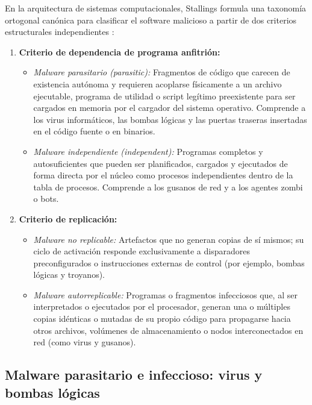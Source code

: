 \documentclass[12pt]{article}
\begin{document}
En la arquitectura de sistemas computacionales, Stallings formula una taxonomía ortogonal canónica para clasificar el software malicioso a partir de dos criterios estructurales independientes \parencite[\S 15.1, p.\ 659]{stallings2018operating}:
\begin{enumerate}[noitemsep, topsep=2pt]
    \item \textbf{Criterio de dependencia de programa anfitrión:}
    \begin{itemize}[noitemsep, topsep=1pt]
        \item \textit{Malware parasitario (\textit{parasitic}):} Fragmentos de código que carecen de existencia autónoma y requieren acoplarse físicamente a un archivo ejecutable, programa de utilidad o script legítimo preexistente para ser cargados en memoria por el cargador del sistema operativo. Comprende a los virus informáticos, las bombas lógicas y las puertas traseras insertadas en el código fuente o en binarios.
        \item \textit{Malware independiente (\textit{independent}):} Programas completos y autosuficientes que pueden ser planificados, cargados y ejecutados de forma directa por el núcleo como procesos independientes dentro de la tabla de procesos. Comprende a los gusanos de red y a los agentes zombi o bots.
    \end{itemize}
    \item \textbf{Criterio de replicación:}
    \begin{itemize}[noitemsep, topsep=1pt]
        \item \textit{Malware no replicable:} Artefactos que no generan copias de sí mismos; su ciclo de activación responde exclusivamente a disparadores preconfigurados o instrucciones externas de control (por ejemplo, bombas lógicas y troyanos).
        \item \textit{Malware autorreplicable:} Programas o fragmentos infecciosos que, al ser interpretados o ejecutados por el procesador, generan una o múltiples copias idénticas o mutadas de su propio código para propagarse hacia otros archivos, volúmenes de almacenamiento o nodos interconectados en red (como virus y gusanos).
    \end{itemize}
\end{enumerate}

\subsection{Malware parasitario e infeccioso: virus y bombas lógicas}\label{subsec:malwareParasitarioVirusBombas}
\end{document}
